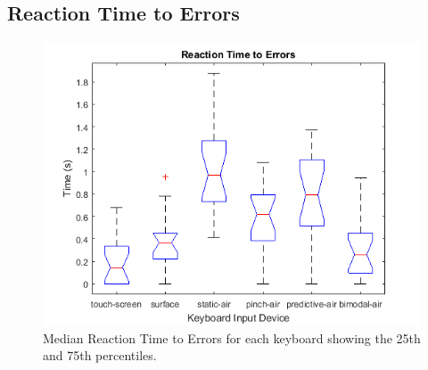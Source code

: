 \subsection{Reaction Time to Errors}
\begin{figure}[h]
	\centering
	\includegraphics{fig_reaction_errors_boxplot}
	\caption[Reaction Time to Errors Boxplot]{Median Reaction Time to Errors for each keyboard showing the 25th and 75th percentiles.}
	\label{fig_reaction_errors_boxplot}
\end{figure}

